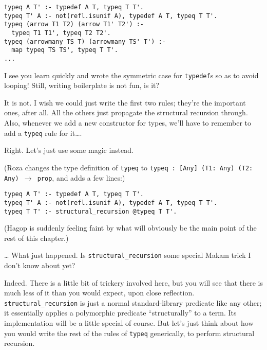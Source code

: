 \begin{verbatim}
typeq A T' :- typedef A T, typeq T T'.
typeq T' A :- not(refl.isunif A), typedef A T, typeq T T'.
typeq (arrow T1 T2) (arrow T1' T2') :-
  typeq T1 T1', typeq T2 T2'.
typeq (arrowmany TS T) (arrowmany TS' T') :-
  map typeq TS TS', typeq T T'.
...
\end{verbatim}

\heroADVISOR{} I see you learn quickly and wrote the symmetric case for
\texttt{typedef}s so as to avoid looping! Still, writing boilerplate is
not fun, is it?

\heroSTUDENT{} It is not. I wish we could just write the first two rules;
they're the important ones, after all. All the others just propagate the
structural recursion through. Also, whenever we add a new constructor
for types, we'll have to remember to add a \texttt{typeq} rule for
it\ldots{}.

\heroADVISOR{} Right. Let's just use some magic instead.

\begin{scenecomment}
(Roza changes the type definition of \texttt{typeq} to \texttt{typeq : [Any] (T1: Any) (T2: Any) \ensuremath{\to} prop},
and adds a few lines:)
\end{scenecomment}

\begin{verbatim}
typeq A T' :- typedef A T, typeq T T'.
typeq T' A :- not(refl.isunif A), typedef A T, typeq T T'.
typeq T T' :- structural_recursion @typeq T T'.
\end{verbatim}

\begin{scenecomment}
(Hagop is suddenly feeling faint by what will obviously be the main point of the rest of this chapter.)
\end{scenecomment}

\heroSTUDENT{} \ldots{} What just happened. Is \texttt{structural\_recursion}
some special Makam trick I don't know about yet?

\heroADVISOR{} Indeed. There is a little bit of trickery involved here, but
you will see that there is much less of it than you would expect, upon
close reflection. \texttt{structural\_recursion} is just a normal
standard-library predicate like any other; it essentially applies a
polymorphic predicate ``structurally'' to a term. Its implementation
will be a little special of course. But let's just think about how you
would write the rest of the rules of \texttt{typeq} generically, to
perform structural recursion.

